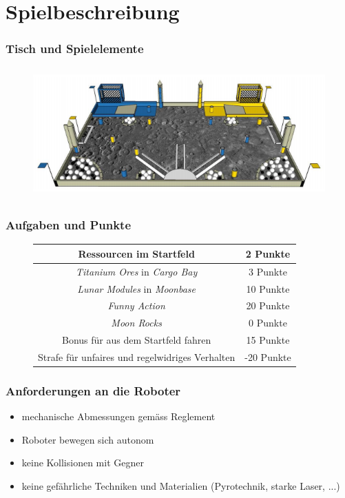 \section{Spielbeschreibung}

\begin{frame}
	\frametitle{Tisch und Spielelemente}
	\begin{figure}
		\centering
		\includegraphics[height = 5cm]{../images/presentation/Spieltisch.png}
	\end{figure}
	
\end{frame}

\begin{frame}
	\frametitle{Aufgaben und Punkte}
	
	\begin{figure}[H]
		\centering
		\begin{tabular}{|c|c|}
			\hline
			Ressourcen im Startfeld & 2 Punkte\\
			\hline
			\textit{Titanium Ores} in \textit{Cargo Bay} & 3 Punkte\\
			\hline
			\textit{Lunar Modules} in \textit{Moonbase} & 10 Punkte\\
			\hline
			\textit{Funny Action} & 20 Punkte\\
			\hline
			\hline
			\textit{Moon Rocks} & 0 Punkte\\
			\hline
			Bonus für aus dem Startfeld fahren & 15 Punkte\\
			\hline
			Strafe für unfaires und regelwidriges Verhalten & -20 Punkte\\
			\hline
		\end{tabular}	
	\end{figure}
\end{frame}

\begin{frame}
	\frametitle{Anforderungen an die Roboter}
	
	\begin{itemize}
		\item mechanische Abmessungen gemäss Reglement
		\item Roboter bewegen sich autonom
		\item keine Kollisionen mit Gegner
		\item keine gefährliche Techniken und Materialien (Pyrotechnik, starke Laser, ...)
	\end{itemize}
	
\end{frame}

